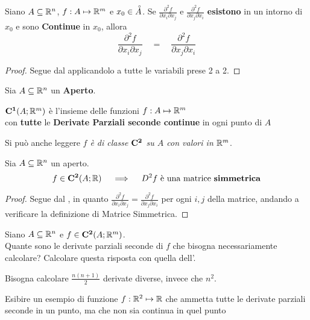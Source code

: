 \begin{corollary}
	Siano $A \subseteq \mathbb{R}^n$, $f:A \mapsto \mathbb{R}^m$ e $x_0 \in \accentset{\circ}{A}$. Se $\frac{\partial^2 f}{\partial x_i \partial x_j}$ e $\frac{\partial^2 f}{\partial x_j \partial x_i}$ \textbf{esistono} in un intorno di $x_0$ e sono \textbf{Continue} in $x_0$, allora
	\[\frac{\partial^2 f}{\partial x_i \partial x_j} \quad = \quad \frac{\partial^2 f}{\partial x_j \partial x_i}\]
	\begin{proof}
		Segue dal  applicandolo a tutte le variabili prese 2 a 2.
	\end{proof}
\end{corollary}

\begin{definition}
	Sia $A \subseteq \mathbb{R}^n$ un \textbf{Aperto}.
	\begin{center}
		$\mathbf{C^{1}}(A; \mathbb{R}^m)$ è l'insieme delle funzioni $f:A \mapsto \mathbb{R}^m$\\
		con \textbf{tutte} le \textbf{Derivate Parziali seconde continue} in ogni punto di $A$
	\end{center}
	Si può anche leggere \textit{$f$ è di classe $\mathbf{C^{2}}$ su $A$ con valori in $\mathbb{R}^m$}.
\end{definition}

\begin{corollary}
	Sia $A \subseteq \mathbb{R}^n$ un aperto.
	\[f \in \mathbf{C^{2}}(A;\mathbb{R}) \quad \implies \quad D^2 f \text{ è una matrice \textbf{simmetrica}}\]
	\begin{proof}
		Segue dal , in quanto $\frac{\partial^2 f}{\partial x_i \partial x_j} = \frac{\partial^2 f}{\partial x_j \partial x_i}$ per ogni $i, j$ della matrice, andando a verificare la definizione di Matrice Simmetrica.
	\end{proof}
\end{corollary}
\begin{exercise}
	Siano $A \subseteq \mathbb{R}^n$ e $f \in \mathbf{C^{2}}(A;\mathbb{R}^m)$.\\
	Quante sono le derivate parziali seconde di $f$ che bisogna necessariamente calcolare? Calcolare questa risposta con quella dell'.
	\begin{solution}
		Bisogna calcolare $\frac{n(n+1)}{2}$ derivate diverse, invece che $n^2$.
	\end{solution}
\end{exercise}
\begin{exercise}
	Esibire un esempio di funzione $f:\mathbb{R}^2 \mapsto \mathbb{R}$ che ammetta tutte le derivate parziali seconde in un punto, ma che non sia continua in quel punto
\end{exercise}

